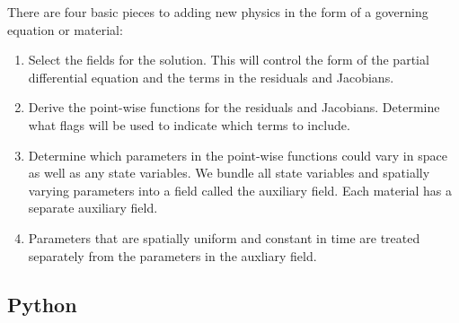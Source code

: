 There are four basic pieces to adding new physics in the form of a
governing equation or material:
\begin{enumerate}
\item Select the fields for the solution. This will control the form
  of the partial differential equation and the terms in the residuals
  and Jacobians.
\item Derive the point-wise functions for the residuals and
  Jacobians. Determine what flags will be used to indicate which terms
  to include.
\item Determine which parameters in the point-wise functions could
  vary in space as well as any state variables. We bundle all state variables
  and spatially varying parameters into a field called the auxiliary
  field. Each material has a separate auxiliary field.
\item Parameters that are spatially uniform and constant in time
  are treated separately from the parameters in the auxliary field.
\end{enumerate}

\subsection{Python}

